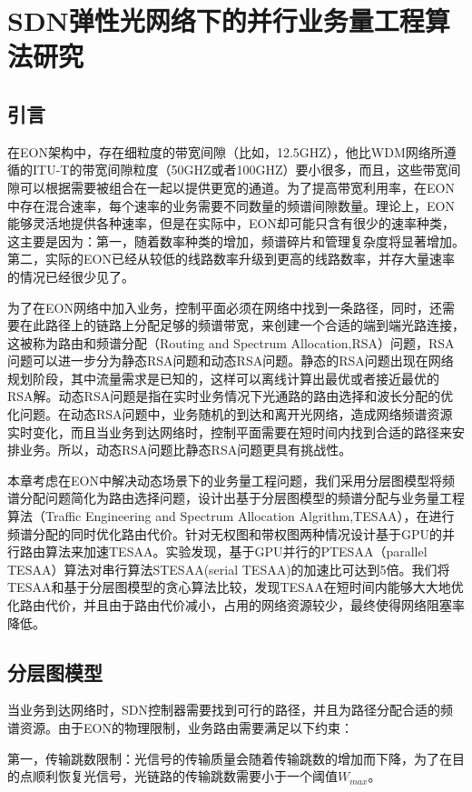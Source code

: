 
\chapter{SDN弹性光网络下的并行业务量工程算法研究}
\section{引言}
在EON架构中，存在细粒度的带宽间隙（比如，12.5GHZ），他比WDM网络所遵循的ITU-T的带宽间隙粒度（50GHZ或者100GHZ）要小很多，而且，这些带宽间隙可以根据需要被组合在一起以提供更宽的通道。为了提高带宽利用率，在EON中存在混合速率，每个速率的业务需要不同数量的频谱间隙数量。理论上，EON能够灵活地提供各种速率，但是在实际中，EON却可能只含有很少的速率种类，这主要是因为：第一，随着数率种类的增加，频谱碎片和管理复杂度将显著增加。第二，实际的EON已经从较低的线路数率升级到更高的线路数率，并存大量速率的情况已经很少见了。

为了在EON网络中加入业务，控制平面必须在网络中找到一条路径，同时，还需要在此路径上的链路上分配足够的频谱带宽，来创建一个合适的端到端光路连接，这被称为路由和频谱分配（Routing and Spectrum Allocation,RSA）问题，RSA问题可以进一步分为静态RSA问题和动态RSA问题。静态的RSA问题出现在网络规划阶段，其中流量需求是已知的，这样可以离线计算出最优或者接近最优的RSA解。动态RSA问题是指在实时业务情况下光通路的路由选择和波长分配的优化问题。在动态RSA问题中，业务随机的到达和离开光网络，造成网络频谱资源实时变化，而且当业务到达网络时，控制平面需要在短时间内找到合适的路径来安排业务。所以，动态RSA问题比静态RSA问题更具有挑战性。

本章考虑在EON中解决动态场景下的业务量工程问题，我们采用分层图模型将频谱分配问题简化为路由选择问题，设计出基于分层图模型的频谱分配与业务量工程算法（Traffic Engineering and Spectrum Allocation Algrithm,TESAA），在进行频谱分配的同时优化路由代价。针对无权图和带权图两种情况设计基于GPU的并行路由算法来加速TESAA。实验发现，基于GPU并行的PTESAA（parallel TESAA）算法对串行算法STESAA(serial TESAA)的加速比可达到5倍。我们将TESAA和基于分层图模型的贪心算法比较，发现TESAA在短时间内能够大大地优化路由代价，并且由于路由代价减小，占用的网络资源较少，最终使得网络阻塞率降低。
\section{分层图模型}
当业务到达网络时，SDN控制器需要找到可行的路径，并且为路径分配合适的频谱资源。由于EON的物理限制，业务路由需要满足以下约束：

第一，传输跳数限制：光信号的传输质量会随着传输跳数的增加而下降，为了在目的点顺利恢复光信号，光链路的传输跳数需要小于一个阈值$W_{max}$。

